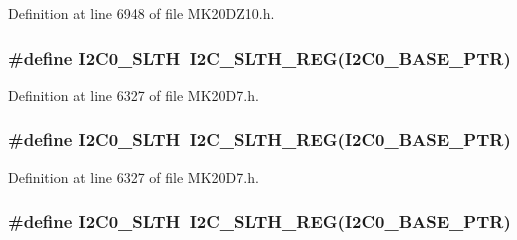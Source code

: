 Definition at line 6948 of file M\+K20\+D\+Z10.\+h.

\subsubsection[{\texorpdfstring{I2\+C0\+\_\+\+S\+L\+TH}{I2C0_SLTH}}]{\setlength{\rightskip}{0pt plus 5cm}\#define I2\+C0\+\_\+\+S\+L\+TH~{\bf I2\+C\+\_\+\+S\+L\+T\+H\+\_\+\+R\+EG}({\bf I2\+C0\+\_\+\+B\+A\+S\+E\+\_\+\+P\+TR})}\hypertarget{group___i2_c___register___accessor___macros_ga5872f84a45507eb59371a4fcc7c3e2c6}{}\label{group___i2_c___register___accessor___macros_ga5872f84a45507eb59371a4fcc7c3e2c6}


Definition at line 6327 of file M\+K20\+D7.\+h.

\subsubsection[{\texorpdfstring{I2\+C0\+\_\+\+S\+L\+TH}{I2C0_SLTH}}]{\setlength{\rightskip}{0pt plus 5cm}\#define I2\+C0\+\_\+\+S\+L\+TH~{\bf I2\+C\+\_\+\+S\+L\+T\+H\+\_\+\+R\+EG}({\bf I2\+C0\+\_\+\+B\+A\+S\+E\+\_\+\+P\+TR})}\hypertarget{group___i2_c___register___accessor___macros_ga5872f84a45507eb59371a4fcc7c3e2c6}{}\label{group___i2_c___register___accessor___macros_ga5872f84a45507eb59371a4fcc7c3e2c6}


Definition at line 6327 of file M\+K20\+D7.\+h.

\subsubsection[{\texorpdfstring{I2\+C0\+\_\+\+S\+L\+TH}{I2C0_SLTH}}]{\setlength{\rightskip}{0pt plus 5cm}\#define I2\+C0\+\_\+\+S\+L\+TH~{\bf I2\+C\+\_\+\+S\+L\+T\+H\+\_\+\+R\+EG}({\bf I2\+C0\+\_\+\+B\+A\+S\+E\+\_\+\+P\+TR})}\hypertarget{group___i2_c___register___accessor___macros_ga5872f84a45507eb59371a4fcc7c3e2c6}{}\label{group___i2_c___register___accessor___macros_ga5872f84a45507eb59371a4fcc7c3e2c6}


